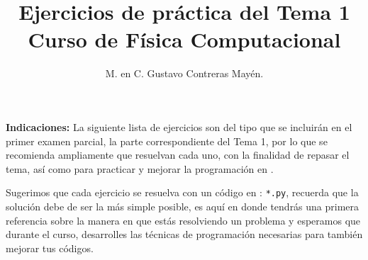 
\author{M. en C. Gustavo Contreras Mayén.}
\title{\vspace{-2cm} Ejercicios de práctica del Tema 1 \\ Curso de Física Computacional}
\date{ }

\maketitle
\fontsize{14}{14}\selectfont
\textbf{Indicaciones: } La siguiente lista de ejercicios son del tipo que se incluirán en el primer examen parcial, la parte correspondiente del Tema 1, por lo que  se recomienda ampliamente que resuelvan cada uno, con la finalidad de repasar el tema, así como para practicar y mejorar la programación en \python.
\par
Sugerimos que cada ejercicio se resuelva con un código en \python: \texttt{*.py}, recuerda que la solución debe de ser la más simple posible, es aquí en donde tendrás una primera referencia sobre la manera en que estás resolviendo un problema y esperamos que durante el curso, desarrolles las técnicas de programación necesarias para también mejorar tus códigos.
